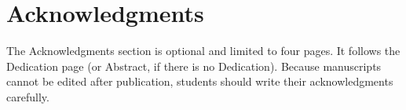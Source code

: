 \chapter*{Acknowledgments}

The Acknowledgments section is optional and limited to four pages.
It follows the Dedication page (or Abstract, if there is no Dedication).
Because manuscripts cannot be edited after publication, students should write their acknowledgments carefully.
